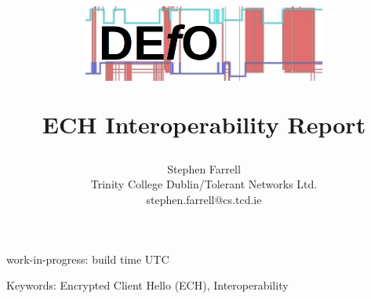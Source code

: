 \documentclass[a4paper]{article}
\begin{document}

\title{
    \begin{center}
\includegraphics[width=0.6\textwidth]{defologo.png}
    \end{center}
ECH Interoperability Report
}

\author{
Stephen Farrell\\
Trinity College Dublin/Tolerant Networks Ltd.\\
\small
stephen.farrell@cs.tcd.ie\\
\normalsize
}





\maketitle
\begin{center}
\small
work-in-progress: build time {\currenttime} UTC\\
\normalsize
\end{center}



\clearpage
\small
\tableofcontents
\normalsize

Keywords: Encrypted Client Hello (ECH), Interoperability












\appendices



\end{document}
